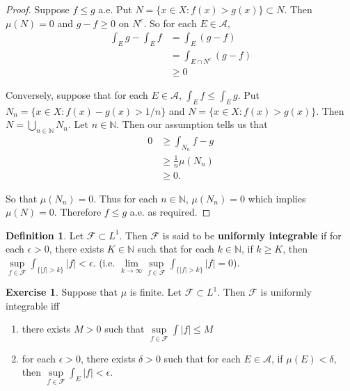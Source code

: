 \documentclass[12pt]{amsart}
\theoremstyle{definition}
\newtheorem{defn}[definition]{Definition}
\newtheorem{ex}[definition]{Exercise}
\newcommand{\del}{\delta}
\newcommand{\ep}{\epsilon}
\newcommand{\N}{\mathbb{N}}
\newcommand{\MA}{\mathcal{A}}
\newcommand{\MF}{\mathcal{F}}
\begin{document}
	\begin{proof}
		Suppose $f \leq g$ a.e. Put $N = \{x\in X: f(x) > g(x)\} \subset N$. Then $\mu(N) = 0$ and $g-f \geq 0$ on $N^c$. So for each $E \in \MA$,
		\begin{align*}
			\int_E g - \int_E f 
			&= \int_E (g-f)\\
			&= \int_{E \cap N^c} (g-f)\\
			& \geq 0
		\end{align*} 
		
		Conversely, suppose that for each $E \in \MA$, $\int_E f \leq \int_E g$. Put $N_n = \{x \in X: f(x) - g(x) > 1/n\}$ and $N = \{x \in X: f(x) > g(x)\}$. Then $N = \bigcup\limits_{n \in \N}N_n$. Let $n \in \N$. Then our assumption tells us that 
		\begin{align*}
			0 
			&\geq \int_{N_n} f-g\\
			& \geq \frac{1}{n} \mu(N_n)\\
			& \geq 0.
		\end{align*} 
		
		So that $\mu(N_n) = 0$. Thus for each $n \in \N$, $\mu(N_n) = 0$ which implies $\mu(N) = 0$. Therefore $f \leq g$ a.e. as required. 
	\end{proof}
	
	\begin{defn}
		Let $\MF \subset L^1$. Then $\MF$ is said to be \textbf{uniformly integrable} if for each $\ep >0$, there exists $K \in \N$ such that for each $k \in \N$, if $k \geq K$, then $\sup\limits_{f \in \MF} \int_{\{|f|>k\}}|f| < \ep$. (i.e. $\lim\limits_{k \rightarrow \infty} \sup\limits_{f \in \MF} \int_{\{|f| > k\}} |f| = 0$).
	\end{defn}
	
	\begin{ex}
		
		Suppose that $\mu$ is finite. Let $\MF \subset L^1$. Then $\MF$ is uniformly integrable iff 
		\begin{enumerate}
			\item there exists $M >0$ such that $\sup\limits_{f \in \MF}\int |f| \leq M$
			\item for each $\ep >0$, there exists $\del >0$ such that for each $E \in \MA$, if $\mu(E) < \del$, then $\sup\limits_{f \in \MF} \int_E |f| < \ep$.
		\end{enumerate}
	\end{ex}
	
\end{document}
